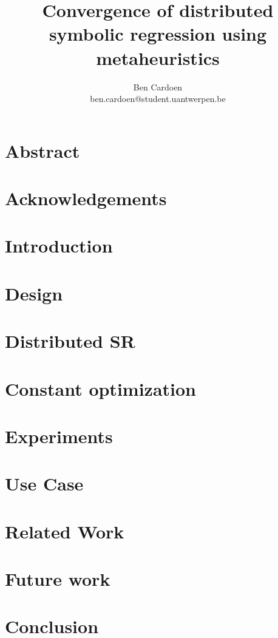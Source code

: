 \documentclass[]{article}
\title{Convergence of distributed symbolic regression using metaheuristics
    }
\author{
    Ben Cardoen  \\
    ben.cardoen@student.uantwerpen.be
}
\begin{document}
    
    \maketitle
    \section{Abstract}
    
    \newpage
    
    \section{Acknowledgements}
    
    \newpage
    
    \tableofcontents
    
    \newpage
    \section{Introduction}
    
    \section{Design}\label{secdesign}
    
    \section{Distributed SR}\label{secdistributed}
    
    \section{Constant optimization}\label{secconstopt}
    
    \section{Experiments}\label{secexperiments}
    
    \section{Use Case}\label{secusecase}
    
    \section{Related Work}
    
	\section{Future work}
    
    \newpage
    \section{Conclusion}
    
    \newpage
	\listoffigures
	\newpage
    \listoftables
    \newpage
    
    
    
\end{document}
